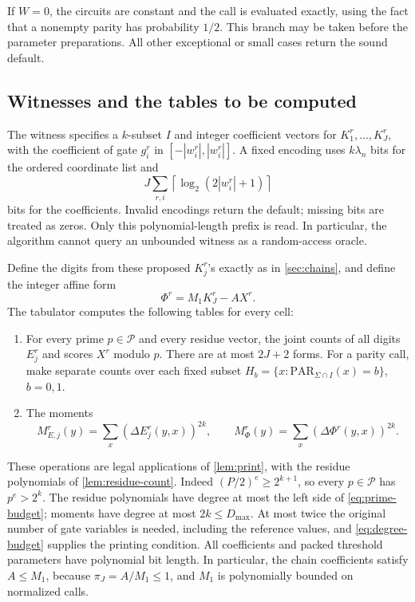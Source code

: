 \documentclass[11pt,letterpaper]{article}
\theoremstyle{definition}
\theoremstyle{remark}
\newcommand{\PAR}{\mathrm{PAR}}
\newcommand{\ceil}[1]{\left\lceil #1\right\rceil}
\newcommand{\abs}[1]{\left|#1\right|}
\newcommand{\cP}{\mathcal P}
\newcommand{\lgx}{\log_2}
\begin{document}
If \(W=0\), the circuits are constant and the call is evaluated
exactly, using the fact that a nonempty parity has probability
\(1/2\). This branch may be taken before the parameter preparations.
All other exceptional or small cases return the sound default.

\subsection{Witnesses and the tables to be computed}

The witness specifies a \(k\)-subset \(I\) and integer coefficient
vectors for \(K_1^r,\ldots,K_J^r\), with the coefficient of gate
\(g_i^r\) in \([-\abs{w_i^r},\abs{w_i^r}]\).
A fixed encoding uses \(k\lambda_n\) bits for the ordered coordinate
list and
\[
 J\sum_{r,i}\ceil{\lgx(2\abs{w_i^r}+1)}
\]
bits for the coefficients. Invalid encodings return the default;
missing bits are treated as zeros. Only this polynomial-length
prefix is read. In particular, the algorithm cannot query an
unbounded witness as a random-access oracle.

Define the digits from these proposed \(K_j^r\)'s exactly as in
\cref{sec:chains}, and define the integer affine form
\[
 \Phi^r=M_1K_J^r-AX^r.
\]
The tabulator computes the following tables for every cell:
\begin{enumerate}[label=(\alph*)]
\item For every prime \(p\in\cP\) and every residue vector, the
joint counts of all digits \(E_j^r\) and scores \(X^r\) modulo
\(p\). There are at most \(2J+2\) forms.
For a parity call, make separate counts over each fixed subset
\(H_b=\{x:\PAR_{\Sigma\cap I}(x)=b\}\), \(b=0,1\).
\item The moments
\[
 M_{E,j}^r(y)=\sum_x(\Delta E_j^r(y,x))^{2k},\qquad
 M_{\Phi}^r(y)=\sum_x(\Delta\Phi^r(y,x))^{2k}.
\]
\end{enumerate}

These operations are legal applications of \cref{lem:print}, with
the residue polynomials of \cref{lem:residue-count}.
Indeed \((P/2)^e\ge2^{k+1}\), so every \(p\in\cP\) has
\(p^e>2^k\). The residue polynomials have degree at most the left
side of \eqref{eq:prime-budget}; moments have degree at most
\(2k\le D_{\max}\). At most twice the original number of gate
variables is needed, including the reference values, and
\eqref{eq:degree-budget} supplies the printing condition.
All coefficients and packed threshold parameters have polynomial
bit length. In particular, the chain coefficients satisfy
\(A\le M_1\), because \(\pi_J=A/M_1\le1\), and \(M_1\) is
polynomially bounded on normalized calls.
\end{document}
